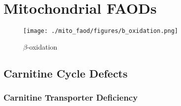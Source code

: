 \documentclass{scrartcl}
\begin{document}
\section{Mitochondrial FAODs}
\label{sec:org0ef904e}
\begin{figure}[htbp]
\centering
\texttt{[image: ./mito\_faod/figures/b\_oxidation.png]}
\caption{\label{fig:org9007180}
\(\beta\)-oxidation}
\end{figure}

\subsection{Carnitine Cycle Defects}
\label{sec:org836c7a7}
\subsubsection{Carnitine Transporter Deficiency}
\label{sec:orga3362ea}
\end{document}
